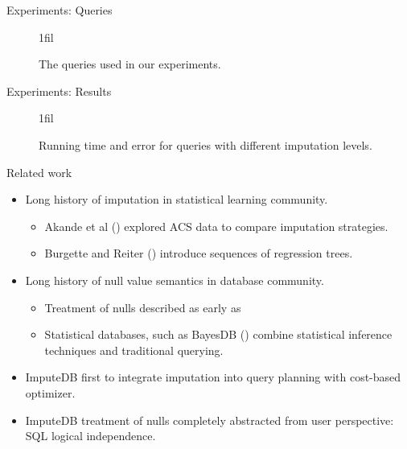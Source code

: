 \documentclass{beamer}
\makeatletter
\newcommand*{\centerfloat}{%
  \parindent \z@
  \leftskip \z@ \@plus 1fil \@minus \textwidth
  \rightskip\leftskip
  \parfillskip \z@skip}
\newcommand{\ProjectName}{ImputeDB}
\makeatother
\begin{document}
\begin{frame}[fragile]{Experiments: Queries}
\begin{figure}
  \centerfloat
  \tiny
  
  \caption{The queries used in our experiments.}
  \label{fig:queries}
\end{figure}
\end{frame}

\begin{frame}[fragile]{Experiments: Results}
\begin{figure}
  \tiny
  \centerfloat
  
  \caption{Running time and error for queries with different imputation levels.}
  \label{fig:experiments}
\end{figure}
\end{frame}



\begin{frame}[fragile]{Related work}
\begin{itemize}
	\item Long history of imputation in statistical learning community.
		\begin{itemize}
			\item Akande et al (\cite{akande2015empirical}) explored ACS data to compare imputation strategies.
			\item Burgette and Reiter (\cite{burgette2010multiple}) introduce sequences of regression trees.
		\end{itemize}
	\item Long history of null value semantics in database community.
		\begin{itemize}
			\item Treatment of nulls described as early as  \cite{codd1973understanding}
			\item Statistical databases, such as BayesDB (\cite{mansinghka2015bayesdb}) combine statistical inference techniques and traditional querying.
		\end{itemize}
	\item \ProjectName{} first to integrate imputation into query planning with cost-based optimizer.
	\item \ProjectName{} treatment of nulls completely abstracted from user perspective: SQL logical independence.
\end{itemize}
\end{frame}
\end{document}
